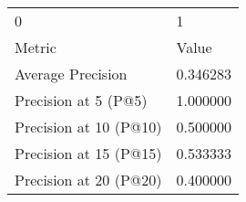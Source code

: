 \begin{tabular}{ll}
0 & 1 \\
Metric & Value \\
Average Precision & 0.346283 \\
Precision at 5 (P@5) & 1.000000 \\
Precision at 10 (P@10) & 0.500000 \\
Precision at 15 (P@15) & 0.533333 \\
Precision at 20 (P@20) & 0.400000 \\
\end{tabular}
